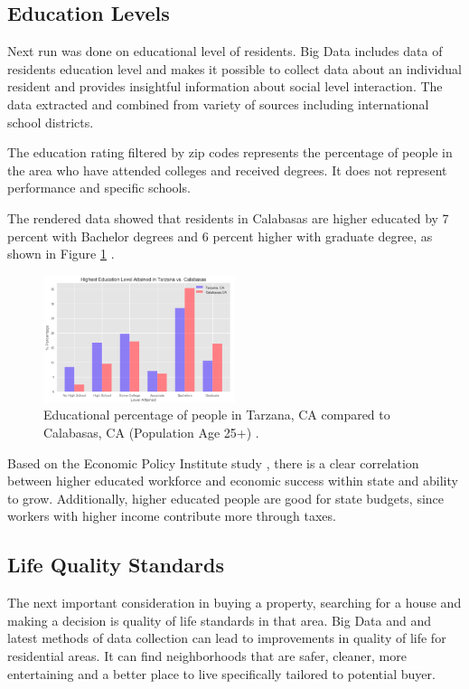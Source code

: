 \documentclass[sigconf]{acmart}
\begin{document}
\subsection{Education Levels}

Next run was done on educational level of residents.
Big Data includes data of resident\textquotesingle s education level and makes it possible to collect data about an individual resident and provides insightful information about social level interaction. The data extracted and combined from variety of sources including international school districts. 

The education rating  filtered by zip codes represents the percentage of people in the area who have attended colleges and received degrees. It does not represent performance and specific schools. 

The rendered data showed \cite{md} that residents in Calabasas are higher educated by 7 percent with Bachelor degrees and 6 percent higher with graduate degree, as shown in Figure \ref{fig:figure2} \cite{md}.

\begin{figure}
  \centering
  \includegraphics[width=0.5\textwidth]{images/figure2.png}
  \caption{Educational percentage of people in Tarzana, CA compared to Calabasas, CA (Population Age 25+) \cite{md}.} \label{fig:figure2} 
\end{figure}

Based on the Economic Policy Institute study \cite{education}, there is a clear correlation between higher educated workforce and economic success within state and ability to grow. Additionally, higher educated people are good for state budgets, since workers with higher income contribute more through taxes. 

\subsection{Life Quality Standards}

The next important consideration in buying a property, searching for a house and making a decision is quality of life standards in that area. Big Data and and latest methods of data collection can lead to improvements in quality of life for residential areas. It can find neighborhoods that are safer, cleaner, more entertaining and a better place to live specifically tailored to potential buyer. 
\end{document}
